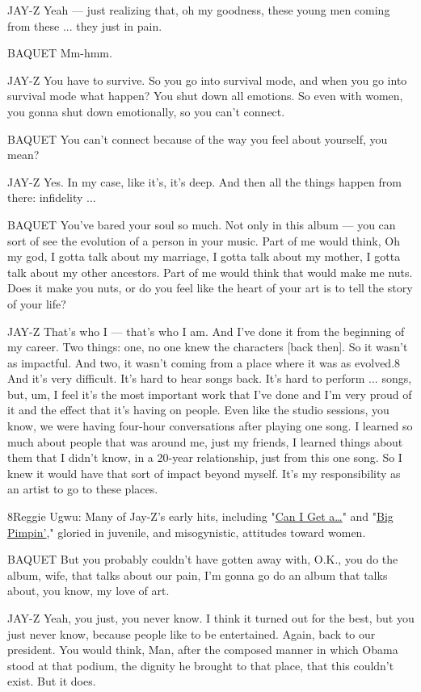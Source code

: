 JAY-Z Yeah --- just realizing that, oh my goodness, these young men
coming from these ... they just in pain.

BAQUET Mm-hmm.

JAY-Z You have to survive. So you go into survival mode, and when you go
into survival mode what happen? You shut down all emotions. So even with
women, you gonna shut down emotionally, so you can't connect.

BAQUET You can't connect because of the way you feel about yourself, you
mean?

JAY-Z Yes. In my case, like it's, it's deep. And then all the things
happen from there: infidelity ...

BAQUET You've bared your soul so much. Not only in this album --- you
can sort of see the evolution of a person in your music. Part of me
would think, Oh my god, I gotta talk about my marriage, I gotta talk
about my mother, I gotta talk about my other ancestors. Part of me would
think that would make me nuts. Does it make you nuts, or do you feel
like the heart of your art is to tell the story of your life?

JAY-Z That's who I --- that's who I am. And I've done it from the
beginning of my career. Two things: one, no one knew the characters
{[}back then{]}. So it wasn't as impactful. And two, it wasn't coming
from a place where it was as evolved.8 And it's very difficult. It's
hard to hear songs back. It's hard to perform ... songs, but, um, I feel
it's the most important work that I've done and I'm very proud of it and
the effect that it's having on people. Even like the studio sessions,
you know, we were having four-hour conversations after playing one song.
I learned so much about people that was around me, just my friends, I
learned things about them that I didn't know, in a 20-year relationship,
just from this one song. So I knew it would have that sort of impact
beyond myself. It's my responsibility as an artist to go to these
places.

8Reggie Ugwu: Many of Jay-Z's early hits, including
"\href{https://www.youtube.com/watch?v=SoqZutsd1m0}{Can I Get
a\ldots{}}" and "\href{https://www.youtube.com/watch?v=Cgoqrgc_0cM}{Big
Pimpin'}," gloried in juvenile, and misogynistic, attitudes toward
women.

BAQUET But you probably couldn't have gotten away with, O.K., you do the
album, wife, that talks about our pain, I'm gonna go do an album that
talks about, you know, my love of art.

JAY-Z Yeah, you just, you never know. I think it turned out for the
best, but you just never know, because people like to be entertained.
Again, back to our president. You would think, Man, after the composed
manner in which Obama stood at that podium, the dignity he brought to
that place, that this couldn't exist. But it does.

